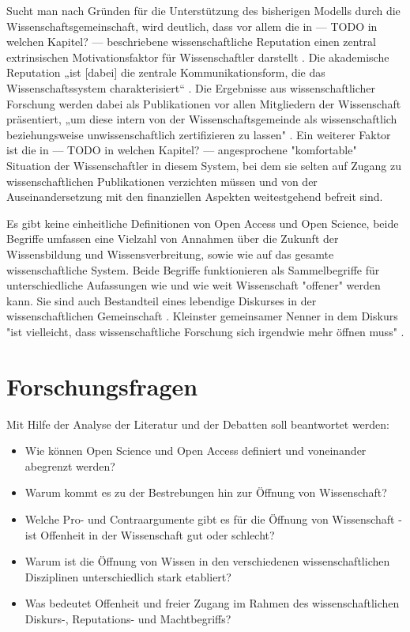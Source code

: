 Sucht man nach Gründen für die Unterstützung des bisherigen Modells durch die Wissenschaftsgemeinschaft, wird deutlich, dass vor allem die in --- TODO in welchen Kapitel? --- beschriebene wissenschaftliche Reputation einen zentral extrinsischen Motivationsfaktor für Wissenschaftler darstellt \cite{minssen_2012_arbeit}. Die akademische Reputation „ist [dabei] die zentrale Kommunikationsform, die das Wissenschaftssystem charakterisiert“ \cite{Rutenfranz_1997}. Die Ergebnisse aus wissenschaftlicher Forschung werden dabei als Publikationen vor allen Mitgliedern der Wissenschaft präsentiert, „um diese intern von der Wissenschaftsgemeinde als wissenschaftlich beziehungsweise unwissenschaftlich zertifizieren zu lassen" \cite{Rutenfranz_1997}. Ein weiterer Faktor ist die in --- TODO in welchen Kapitel? --- angesprochene "komfortable" Situation der Wissenschaftler in diesem System, bei dem sie selten auf Zugang zu wissenschaftlichen Publikationen verzichten müssen und von der Auseinandersetzung mit den finanziellen Aspekten weitestgehend befreit sind.

Es gibt keine einheitliche Definitionen von Open Access und Open Science, beide Begriffe umfassen eine Vielzahl von Annahmen über die Zukunft der Wissensbildung und Wissensverbreitung, sowie wie auf das gesamte wissenschaftliche System. Beide Begriffe funktionieren als Sammelbegriffe für unterschiedliche Aufassungen wie und wie weit Wissenschaft "offener" werden kann. Sie sind auch Bestandteil eines lebendige Diskurses in der wissenschaftlichen Gemeinschaft \cite{schulze_2013_open}. Kleinster gemeinsamer Nenner in dem Diskurs "ist vielleicht, dass wissenschaftliche Forschung sich irgendwie mehr öffnen muss" \cite{cite:9}.

\section{Forschungsfragen}

Mit Hilfe der Analyse der Literatur und der Debatten soll beantwortet werden:
\begin{itemize}
\item Wie können Open Science und Open Access definiert und voneinander abegrenzt werden?
\item Warum kommt es zu der Bestrebungen hin zur Öffnung von Wissenschaft?
\item Welche Pro- und Contraargumente gibt es für die Öffnung von Wissenschaft - ist Offenheit in der Wissenschaft gut oder schlecht?
\item Warum ist die Öffnung von Wissen in den verschiedenen wissenschaftlichen Disziplinen unterschiedlich stark etabliert?
\item Was bedeutet Offenheit und freier Zugang im Rahmen des wissenschaftlichen Diskurs-, Reputations- und Machtbegriffs?
\end{itemize}

